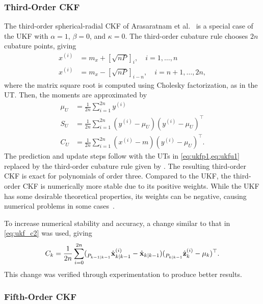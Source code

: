 \documentclass[../zhang_thesis.tex]{subfiles}
\begin{document}
\subsubsection{Third-Order CKF}
\label{sec:ckf3}

The third-order spherical-radial CKF of Arasaratnam et al.~\cite{arasaratnam09,arasaratnam10} is a special case of the UKF with $\alpha=1$, $\beta=0$, and $\kappa=0$. The third-order cubature rule chooses $2n$ cubature points, giving~\cite{arasaratnam10}
\begin{align}
    x^{(i)} & = m_x + \left[ \sqrt{nP} \right]_i, \quad i=1,\dots,n \label{eq:cr3_1} \\
    x^{(i)} & = m_x - \left[ \sqrt{nP} \right]_{i-n}, \quad i=n+1,\dots,2n,
\end{align}
where the matrix square root is computed using Cholesky factorization, as in the UT. Then, the moments are approximated by
\begin{align}
    \mu_U & = \frac{1}{2n} \sum_{i=1}^{2n} y^{(i)} \\
    S_U & = \frac{1}{2n} \sum_{i=1}^{2n} ( y^{(i)} - \mu_U ) ( y^{(i)} - \mu_U )^\top \\
    C_U & = \frac{1}{2n} \sum_{i=1}^{2n} ( x^{(i)} - m ) ( y^{(i)} - \mu_U )^\top. \label{eq:cr3_l}
\end{align}
The prediction and update steps follow  with the UTs in \cref{eq:ukfp1,eq:ukfu1} replaced by the third-order cubature rule given by . The resulting third-order CKF is exact for polynomials of order three. Compared to the UKF, the third-order CKF is numerically more stable due to its positive weights. While the UKF has some desirable theoretical properties, its weights can be negative, causing numerical problems in some
cases~\cite{sarkka12}.

To increase numerical stability and accuracy, a change similar to that in \cref{eq:ukf_c2} was used, giving
\begin{equation}
    C_k = \frac{1}{2n} \sum_{i=0}^{2n} ( \prescript{}{P_{k-1|k-1}}{\hat{\mathbf{x}}}_{k|k-1}^{(i)} - \hat{\mathbf{x}}_{k|k-1} ) ( \prescript{}{P_{k|k-1}}{\hat{\mathbf{z}}}_k^{(i)} - \mu_k )^\top.
    \label{eq:ckf3_c}
\end{equation}
This change was verified through experimentation to produce better results.

\subsubsection{Fifth-Order CKF}
\end{document}
